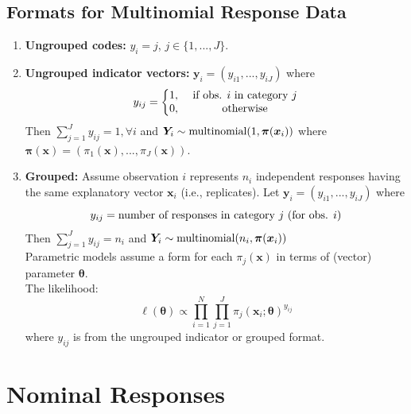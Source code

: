 \documentclass[11pt]{elegantbook}
\begin{document}
\subsection{Formats for Multinomial Response Data}
\begin{enumerate}[$\bullet$]
    \item \textbf{Ungrouped codes:} $y_i=j$, $j\in\{1,...,J\}$.
    \item \textbf{Ungrouped indicator vectors:} $\boldsymbol{y}_i=(y_{i1},...,y_{iJ})$ where $$y_{ij}=\left\{\begin{matrix}
        1,&\textnormal{ if obs. $i$ in category $j$}\\
        0,&\textnormal{ otherwise}
    \end{matrix}\right.$$
    Then $\sum_{j=1}^J y_{ij}=1,\forall i$ and $\boldsymbol{Y}_i\sim \textnormal{multinomial}(1,\boldsymbol{\pi}(\boldsymbol{x}_i))$ where $\boldsymbol{\pi}(\boldsymbol{x})=\left(\pi_1(\boldsymbol{x}),...,\pi_J(\boldsymbol{x})\right)$.
    \item \textbf{Grouped:} Assume observation $i$ represents $n_i$ independent responses having the same explanatory vector $\boldsymbol{x}_i$ (i.e., replicates). Let $\boldsymbol{y}_i=(y_{i1},...,y_{iJ})$ where $$y_{ij}=\textnormal{number of responses in category $j$ (for obs. $i$)}$$
    Then $\sum_{j=1}^J y_{ij}=n_i$ and $\boldsymbol{Y}_i\sim \textnormal{multinomial}(n_i,\boldsymbol{\pi}(\boldsymbol{x}_i))$\\
    Parametric models assume a form for each $\pi_j(\boldsymbol{x})$ in terms of (vector) parameter $\boldsymbol{\theta}$.\\
    The likelihood:
    $$
    \ell(\boldsymbol{\theta}) \propto \prod_{i=1}^N \prod_{j=1}^J \pi_j\left(\boldsymbol{x}_i ; \boldsymbol{\theta}\right)^{y_{i j}}
    $$
    where $y_{i j}$ is from the ungrouped indicator or grouped format.
\end{enumerate}


\section{Nominal Responses}
\end{document}
